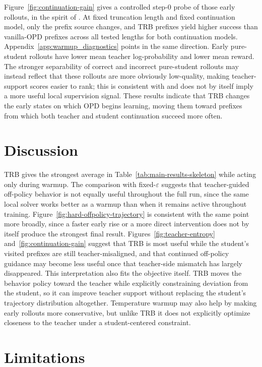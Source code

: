 \documentclass[11pt]{article}
\begin{document}
Figure~\ref{fig:continuation-gain} gives a controlled step-0 probe of those early rollouts, in the spirit of \citet{li2026rethinking}.
At fixed truncation length and fixed continuation model, only the prefix source changes, and TRB prefixes yield higher success than vanilla-OPD prefixes across all tested lengths for both continuation models.
Appendix~\ref{app:warmup_diagnostics} points in the same direction. Early pure-student rollouts have lower mean teacher log-probability and lower mean reward.
The stronger separability of correct and incorrect pure-student rollouts may instead reflect that these rollouts are more obviously low-quality, making teacher-support scores easier to rank; this is consistent with \citet{li2026rethinking} and does not by itself imply a more useful local supervision signal.
These results indicate that TRB changes the early states on which OPD begins learning, moving them toward prefixes from which both teacher and student continuation succeed more often.

\section{Discussion}

TRB gives the strongest average in Table~\ref{tab:main-results-skeleton} while acting only during warmup.
The comparison with fixed-$\varepsilon$ suggests that teacher-guided off-policy behavior is not equally useful throughout the full run, since the same local solver works better as a warmup than when it remains active throughout training.
Figure~\ref{fig:hard-offpolicy-trajectory} is consistent with the same point more broadly, since a faster early rise or a more direct intervention does not by itself produce the strongest final result.
Figures~\ref{fig:teacher-entropy} and~\ref{fig:continuation-gain} suggest that TRB is most useful while the student's visited prefixes are still teacher-misaligned, and that continued off-policy guidance may become less useful once that teacher-side mismatch has largely disappeared.
This interpretation also fits the objective itself. TRB moves the behavior policy toward the teacher while explicitly constraining deviation from the student, so it can improve teacher support without replacing the student's trajectory distribution altogether.
Temperature warmup may also help by making early rollouts more conservative, but unlike TRB it does not explicitly optimize closeness to the teacher under a student-centered constraint.

\section{Limitations}
\end{document}
